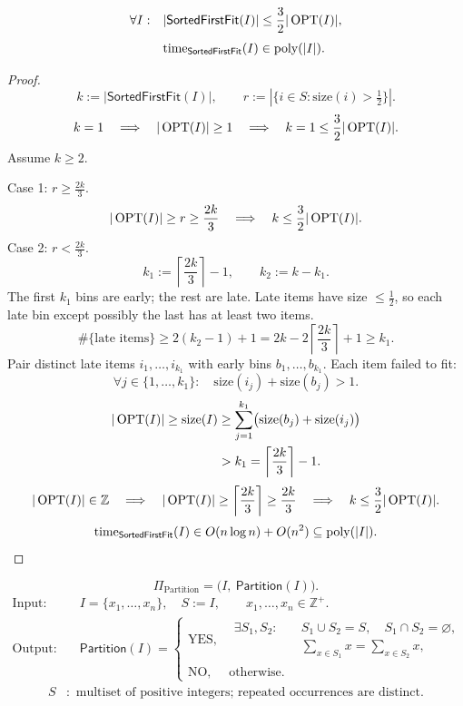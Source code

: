 \documentclass[12pt,a4paper]{article}
\begin{document}
\begin{theorem}
\[
\begin{aligned}
\forall I:\quad &|\mathsf{SortedFirstFit}(I)|\leq\frac32|\operatorname{OPT}(I)|,\\[3pt]
&\mathrm{time}_{\mathsf{SortedFirstFit}}(I)\in\operatorname{poly}(|I|).
\end{aligned}
\]
\end{theorem}
\begin{proof}
\[
k:=|\mathsf{SortedFirstFit}(I)|,\qquad
r:=|\{i\in S:\mathrm{size}(i)>\tfrac12\}|.
\]
\[
k=1\quad\Longrightarrow\quad
|\operatorname{OPT}(I)|\geq1\quad\Longrightarrow\quad
k=1\leq\frac32|\operatorname{OPT}(I)|.
\]
Assume $k\geq2$.

Case 1: $r\geq\frac{2k}{3}$.
\[
|\operatorname{OPT}(I)|\geq r\geq\frac{2k}{3}
\quad\Longrightarrow\quad k\leq\frac32|\operatorname{OPT}(I)|.
\]
Case 2: $r<\frac{2k}{3}$.
\[
k_1:=\left\lceil\frac{2k}{3}\right\rceil-1,
\qquad k_2:=k-k_1.
\]
The first $k_1$ bins are early; the rest are late.
Late items have size $\leq\frac12$, so each late bin except possibly the last
has at least two items.
\[
\#\{\text{late items}\}
\geq2(k_2-1)+1
=2k-2\left\lceil\frac{2k}{3}\right\rceil+1
\geq k_1.
\]
Pair distinct late items $i_1,\ldots,i_{k_1}$ with early bins $b_1,\ldots,b_{k_1}$.
Each item failed to fit:
\[
\forall j\in\{1,\ldots,k_1\}:\quad
\mathrm{size}(i_j)+\mathrm{size}(b_j)>1.
\]
\[
\begin{aligned}
|\operatorname{OPT}(I)|\geq\mathrm{size}(I)
&\geq\sum_{j=1}^{k_1}\bigl(\mathrm{size}(b_j)+\mathrm{size}(i_j)\bigr)\\
&>k_1=\left\lceil\frac{2k}{3}\right\rceil-1.
\end{aligned}
\]
\[
|\operatorname{OPT}(I)|\in\mathbb Z
\quad\Longrightarrow\quad
|\operatorname{OPT}(I)|\geq\left\lceil\frac{2k}{3}\right\rceil\geq\frac{2k}{3}
\quad\Longrightarrow\quad k\leq\frac32|\operatorname{OPT}(I)|.
\]
\[
\mathrm{time}_{\mathsf{SortedFirstFit}}(I)
\in O(n\log n)+O(n^2)\subseteq\operatorname{poly}(|I|).
\]
\end{proof}

\begin{definition}
\[
\Pi_{\mathrm{Partition}}
=\bigl(I,\ \mathsf{Partition}(I)\bigr).
\]
\[
\begin{aligned}
\text{Input:}\quad &I=\{x_1,\ldots,x_n\},\quad S:=I,
\qquad x_1,\ldots,x_n\in\mathbb Z^{+}.\\[3pt]
\text{Output:}\quad &\mathsf{Partition}(I)=
\begin{cases}
\mathrm{YES},&\begin{aligned}
\exists S_1,S_2:\quad&S_1\cup S_2=S,\quad S_1\cap S_2=\varnothing,\\
&\displaystyle\sum_{x\in S_1}x=\sum_{x\in S_2}x,
\end{aligned}\\[6pt]
\mathrm{NO},&\text{otherwise}.
\end{cases}
\end{aligned}
\]
\[
\begin{aligned}
S&:\text{ multiset of positive integers; repeated occurrences are distinct}.
\end{aligned}
\]
\end{definition}
\end{document}
